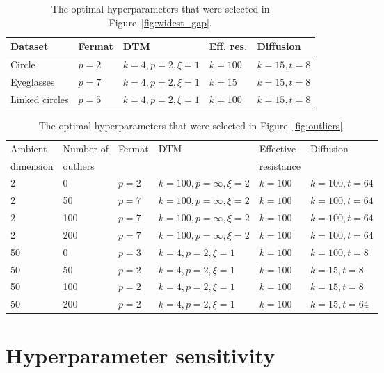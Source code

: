 \documentclass{article}
\theoremstyle{plain}
\theoremstyle{definition}
\theoremstyle{remark}
\begin{document}
\begin{table}[t]
    \centering
    \caption{The optimal hyperparameters that were  selected in Figure~\ref{fig:widest_gap}.}
    \begin{tabular}{lllll}
        \toprule
        Dataset & Fermat & DTM & Eff. res. & Diffusion\\
        \midrule
        Circle         & $p=2$ & $k=4, p=2, \xi=1$ & $k=100$ & $k=15, t=8$ \\
        Eyeglasses     & $p=7$ & $k=4, p=2, \xi=1$ & $k=15$  & $k=15, t=8$ \\
        Linked circles & $p=5$ & $k=4, p=2, \xi=1$ & $k=100$  & $k=15, t=8$ \\
        \bottomrule
    \end{tabular}
    \label{tab:hyperparam_widest}
\end{table}

\begin{table}[t]
    \centering
    \caption{The optimal hyperparameters that were  selected in Figure~\ref{fig:outliers}.}
    \begin{tabular}{llllll}
        \toprule
        Ambient & Number of & Fermat & DTM & Effective & Diffusion\\
        dimension & outliers && &resistance &\\
        \midrule
        2 & 0        & $p=2$ & $k=100, p=\infty, \xi=2$ & $k=100$ & $k=100, t=64$ \\
        2 & 50       & $p=7$ & $k=100, p=\infty, \xi=2$ & $k=100$ & $k=100, t=64$ \\
        2 & 100      & $p=7$ & $k=100, p=\infty, \xi=2$ & $k=100$ & $k=100, t=64$ \\
        2 & 200      & $p=7$ & $k=100, p=\infty, \xi=2$ & $k=100$ & $k=100, t=64$ \\
        50 & 0       & $p=3$ & $k=4, p=2,\xi=1$ & $k=100$ & $k=100, t=8$\\
        50& 50       & $p=2$ & $k=4, p=2,\xi=1$ & $k=100$ & $k=15, t=8$\\
        50 & 100     & $p=2$ & $k=4, p=2,\xi=1$ & $k=100$ & $k=15, t=8$ \\
        50 & 200     & $p=2$ & $k=4, p=2,\xi=1$ & $k=100$ & $k=15, t=64$ \\
        \bottomrule
    \end{tabular}
    \label{tab:hyperparam_outliers}
\end{table}



\section{Hyperparameter sensitivity}\label{sec:hyperparam_sensitivity}
\end{document}
